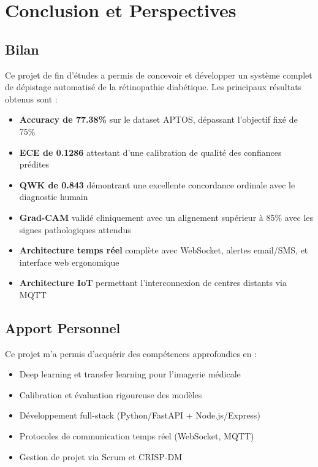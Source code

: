 \documentclass[12pt,a4paper,oneside]{report}
\begin{document}
\chapter*{Conclusion et Perspectives}

\section*{Bilan}

Ce projet de fin d'études a permis de concevoir et développer un système
complet de dépistage automatisé de la rétinopathie diabétique. Les
principaux résultats obtenus sont :

\begin{itemize}
    \item \textbf{Accuracy de 77.38\%} sur le dataset APTOS, dépassant
          l'objectif fixé de 75\%
    \item \textbf{ECE de 0.1286} attestant d'une calibration de qualité
          des confiances prédites
    \item \textbf{QWK de 0.843} démontrant une excellente concordance
          ordinale avec le diagnostic humain
    \item \textbf{Grad-CAM} validé cliniquement avec un alignement
          supérieur à 85\% avec les signes pathologiques attendus
    \item \textbf{Architecture temps réel} complète avec WebSocket,
          alertes email/SMS, et interface web ergonomique
    \item \textbf{Architecture IoT} permettant l'interconnexion
          de centres distants via MQTT
\end{itemize}

\section*{Apport Personnel}

Ce projet m'a permis d'acquérir des compétences approfondies en :
\begin{itemize}
    \item Deep learning et transfer learning pour l'imagerie médicale
    \item Calibration et évaluation rigoureuse des modèles
    \item Développement full-stack (Python/FastAPI + Node.js/Express)
    \item Protocoles de communication temps réel (WebSocket, MQTT)
    \item Gestion de projet via Scrum et CRISP-DM
\end{itemize}
\end{document}
